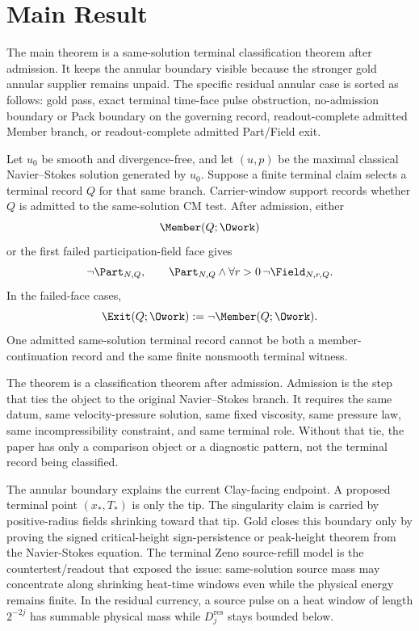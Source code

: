\section{Main Result}

The main theorem is a same-solution terminal classification theorem after admission.  It keeps the annular boundary visible because the stronger gold annular supplier remains unpaid.  The specific residual annular case is sorted as follows: gold pass, exact terminal time-face pulse obstruction, no-admission boundary or Pack boundary on the governing record, readout-complete admitted Member branch, or readout-complete admitted Part/Field exit.

\begin{theorem}
Let \(u_0\) be smooth and divergence-free, and let \((u,p)\) be the maximal classical Navier--Stokes solution generated by \(u_0\).  Suppose a finite terminal claim selects a terminal record \(Q\) for that same branch.  Carrier-window support records whether \(Q\) is admitted to the same-solution CM test.  After admission, either
\[
  \Member(Q;\Owork)
\]
or the first failed participation-field face gives
\[
  \neg\Part_{N,Q},
  \qquad
  \Part_{N,Q}\wedge\forall r>0\,\neg\Field_{N,r,Q}.
\]
In the failed-face cases,
\[
  \Exit(Q;\Owork):=\neg\Member(Q;\Owork).
\]
One admitted same-solution terminal record cannot be both a member-continuation record and the same finite nonsmooth terminal witness.
\end{theorem}

The theorem is a classification theorem after admission.  Admission is the step that ties the object to the original Navier--Stokes branch.  It requires the same datum, same velocity-pressure solution, same fixed viscosity, same pressure law, same incompressibility constraint, and same terminal role.  Without that tie, the paper has only a comparison object or a diagnostic pattern, not the terminal record being classified.

The annular boundary explains the current Clay-facing endpoint.  A proposed terminal point \((x_*,T_*)\) is only the tip.  The singularity claim is carried by positive-radius fields shrinking toward that tip.  Gold closes this boundary only by proving the signed critical-height sign-persistence or peak-height theorem from the Navier-Stokes equation.  The terminal Zeno source-refill model is the countertest/readout that exposed the issue: same-solution source mass may concentrate along shrinking heat-time windows even while the physical energy remains finite.  In the residual currency, a source pulse on a heat window of length \(2^{-2j}\) has summable physical mass while \(D_j^{\mathrm{res}}\) stays bounded below.

